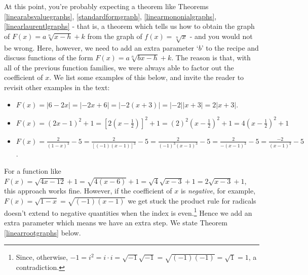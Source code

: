 \documentclass{ximera}
\begin{document}
At this point, you're probably expecting a theorem like Theorems \ref{linearabsvaluegraphs}, \ref{standardformgraph}, \ref{linearmononialgraphs},  \ref{linearlaurentlgraphs} - that is, a theorem which tells us how to obtain the graph of $F(x) = a \sqrt[n]{x-h}+k$ from the  graph of $f(x) = \sqrt[n]{x}$ - and you would not be wrong.  Here, however, we need to add an extra parameter `$b$' to the recipe and discuss functions of the form $F(x) = a \sqrt[n]{bx-h}+k$.  The reason is that, with all of the previous function families, we were always able to factor out the coefficient of $x$. We list some examples of this below, and invite the reader to revisit other examples in the text:

\begin{itemize}

\item  $F(x) = |6-2x| = |-2x+6| = |-2(x+3)| = |-2||x+3| = 2 |x+3|$.

\item  $F(x) = (2x-1)^2 + 1 = \left[2 \left(x - \frac{1}{2}\right)\right]^2+1 = (2)^2 \left(x - \frac{1}{2}\right)^2  + 1 =  4\left(x - \frac{1}{2}\right)^2 + 1$

\item  $F(x) = \frac{2}{(1-x)^3}- 5 = \frac{2}{[(-1)(x-1)]^3} - 5= \frac{2}{(-1)^3(x-1)^3} - 5 = \frac{2}{- (x-1)^3} - 5 = \frac{-2}{(x-1)^3} - 5$.

\end{itemize}

For a function like $F(x) = \sqrt{4x-12} + 1 = \sqrt{4(x-6)} + 1 = \sqrt{4}\sqrt{x-3} + 1 = 2 \sqrt{x-3} + 1$, this approach works fine.   However, if the coefficient of $x$ is \textit{negative},   for example, $F(x) = \sqrt{1-x} = \sqrt{(-1)(x-1)}$ we get stuck the product rule for radicals doesn't extend to negative quantities when the index is even.\footnote{Since, otherwise, $-1 = i^2 = i \cdot i = \sqrt{-1}\sqrt{-1} = \sqrt{(-1)(-1)} = \sqrt{1} = 1$, a contradiction.}   Hence we add an extra parameter which means we have an extra step.  We state Theorem \ref{linearrootgraphs} below.


\end{document}
